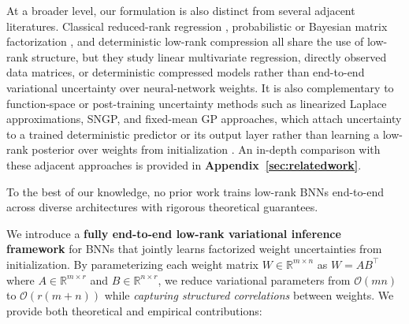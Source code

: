 \documentclass{article}
\theoremstyle{plain}
\theoremstyle{definition}
\theoremstyle{remark}
\begin{document}
At a broader level, our formulation is also distinct from several adjacent literatures. Classical reduced-rank regression \citep{izenman1975reduced,reinsel1998multivariate}, probabilistic or Bayesian matrix factorization \citep{mnih2007probabilistic,salakhutdinov2008bayesian}, and deterministic low-rank compression \citep{denton2014exploiting,alvarez2017compression} all share the use of low-rank structure, but they study linear multivariate regression, directly observed data matrices, or deterministic compressed models rather than end-to-end variational uncertainty over neural-network weights. It is also complementary to function-space or post-training uncertainty methods such as linearized Laplace approximations, SNGP, and fixed-mean GP approaches, which attach uncertainty to a trained deterministic predictor or its output layer rather than learning a low-rank posterior over weights from initialization \citep{immer2021improving,liu2020simple,ortega2024fixed}. An in-depth comparison with these adjacent approaches is provided in \textbf{Appendix~\ref{sec:relatedwork}}.


To the best of our knowledge, no prior work trains low-rank BNNs end-to-end across diverse architectures with rigorous theoretical guarantees.


We introduce a \textbf{fully end-to-end low-rank variational inference framework} for BNNs that jointly learns factorized weight uncertainties from initialization. By parameterizing each weight matrix $W\in \mathbb{R}^{m \times n}$ as $W = AB^\top$ where $A \in \mathbb{R}^{m \times r}$ and $B \in \mathbb{R}^{n \times r}$, we reduce variational parameters from $\mathcal{O}(mn)$ to $\mathcal{O}(r(m+n))$ while \emph{capturing structured correlations} between weights. We provide both theoretical and empirical contributions:
\end{document}
